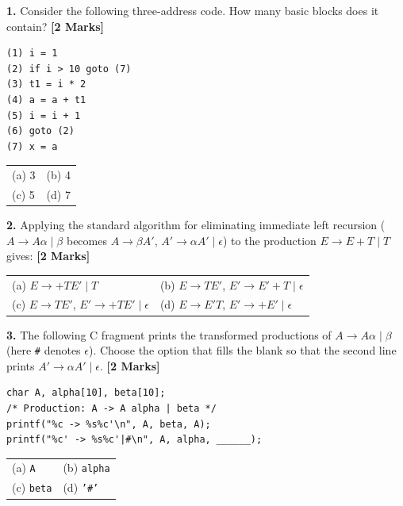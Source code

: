 \documentclass[11pt,a4paper]{article}
\begin{document}

\noindent \textbf{1.} Consider the following three-address code. How many basic blocks does it contain? \hfill \textbf{[2 Marks]}
\begin{lstlisting}
(1) i = 1
(2) if i > 10 goto (7)
(3) t1 = i * 2
(4) a = a + t1
(5) i = i + 1
(6) goto (2)
(7) x = a
\end{lstlisting}
\vspace{0.06cm}
\noindent
\begin{tabularx}{\textwidth}{@{}X X@{}}
(a) 3 & (b) 4 \\[3pt]
(c) 5 & (d) 7 \\
\end{tabularx}

\vspace{0.22cm}

\noindent \textbf{2.} Applying the standard algorithm for eliminating immediate left recursion ($A \rightarrow A\alpha \mid \beta$ becomes $A \rightarrow \beta A'$, $A' \rightarrow \alpha A' \mid \epsilon$) to the production $E \rightarrow E + T \mid T$ gives: \hfill \textbf{[2 Marks]}
\vspace{0.06cm}
\noindent
\begin{tabularx}{\textwidth}{@{}X X@{}}
(a) $E \rightarrow +TE' \mid T$ & (b) $E \rightarrow TE'$, \quad $E' \rightarrow E'+T \mid \epsilon$ \\[3pt]
(c) $E \rightarrow TE'$, \quad $E' \rightarrow +TE' \mid \epsilon$ & (d) $E \rightarrow E'T$, \quad $E' \rightarrow +E' \mid \epsilon$ \\
\end{tabularx}

\vspace{0.22cm}

\noindent \textbf{3.} The following C fragment prints the transformed productions of $A \rightarrow A\alpha \mid \beta$ (here \texttt{\#} denotes $\epsilon$). Choose the option that fills the blank so that the second line prints $A' \rightarrow \alpha A' \mid \epsilon$. \hfill \textbf{[2 Marks]}
\begin{lstlisting}
char A, alpha[10], beta[10];
/* Production: A -> A alpha | beta */
printf("%c -> %s%c'\n", A, beta, A);
printf("%c' -> %s%c'|#\n", A, alpha, ______);
\end{lstlisting}
\vspace{0.06cm}
\noindent
\begin{tabularx}{\textwidth}{@{}X X@{}}
(a) \texttt{A} & (b) \texttt{alpha} \\[3pt]
(c) \texttt{beta} & (d) \texttt{'\#'} \\
\end{tabularx}
\end{document}
